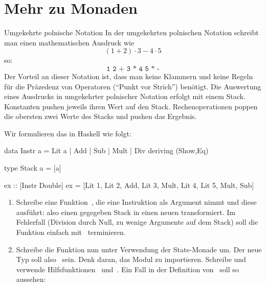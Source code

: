 \documentclass{uebblatt}
\begin{document}


\section{Mehr zu Monaden}

\begin{aufgabe}{Umgekehrte polnische Notation}
In der umgekehrten polnischen Notation schreibt man einen mathematischen
Ausdruck wie
\[ (1 + 2) \cdot 3 - 4 \cdot 5 \]
so:
\[ \texttt{1 2 + 3 * 4 5 * -} \]
Der Vorteil an dieser Notation ist, dass man keine Klammern und keine Regeln
für die Präzedenz von Operatoren ("`Punkt vor Strich"') benötigt. Die
Auswertung eines Ausdrucks in umgekehrter polnischer Notation erfolgt mit
einem Stack. Konstanten pushen jeweils ihren Wert auf den Stack.
Rechenoperationen poppen die obersten zwei Werte des Stacks und pushen das
Ergebnis.

Wir formulieren das in Haskell wie folgt:

\begin{haskellcode}
data Instr a
    = Lit a
    | Add
    | Sub
    | Mult
    | Div
    deriving (Show,Eq)

type Stack a = [a]

ex :: [Instr Double]
ex = [Lit 1, Lit 2, Add, Lit 3, Mult, Lit 4, Lit 5, Mult, Sub]
\end{haskellcode}

\begin{enumerate}
\item Schreibe eine Funktion~, die eine Instruktion als Argument nimmt und diese ausführt: also einen
gegegeben Stack in einen neuen transformiert. Im Fehlerfall (Division durch
Null, zu wenige Argumente auf dem Stack) soll die Funktion einfach
mit~ terminieren.
\item Schreibe die Funktion nun unter Verwendung der State-Monade um. Der neue
Typ soll also~
sein. Denk daran, das Modul  zu importieren.
Schreibe und verwende Hilfsfunktionen~ und~. Ein Fall in der Definition
von~ soll so aussehen:


\end{enumerate}
\end{aufgabe}
\end{document}
